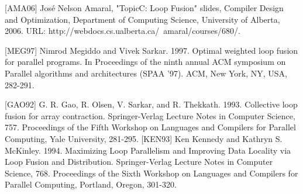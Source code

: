 \begin{thebibliography}{99}

\beamertemplatebookbibitems
{} [AMA06] José Nelson Amaral, "TopicC: Loop Fusion" slides, Compiler Design and Optimization, Department of Computing Science, University of Alberta, 2006. URL: http://webdocs.cs.ualberta.ca/~amaral/courses/680/.


\beamertemplatearticlebibitems

 [MEG97] Nimrod Megiddo and Vivek Sarkar. 1997. Optimal weighted loop fusion for parallel programs. In Proceedings of the ninth annual ACM symposium on Parallel algorithms and architectures (SPAA '97). ACM, New York, NY, USA, 282-291.

 [GAO92] G. R. Gao, R. Olsen, V. Sarkar, and R. Thekkath. 1993. Collective loop fusion for array contraction. Springer-Verlag Lecture Notes in Computer Science, 757. Proceedings of the Fifth Workshop on Languages and Compilers for Parallel Computing, Yale University, 281-295.
 [KEN93] Ken Kennedy and Kathryn S. McKinley. 1994. Maximizing Loop Parallelism and Improving Data Locality via Loop Fusion and Distribution. Springer-Verlag Lecture Notes in Computer Science, 768. Proceedings of the Sixth Workshop on Languages and Compilers for Parallel Computing, Portland, Oregon, 301-320.

\end{thebibliography}
